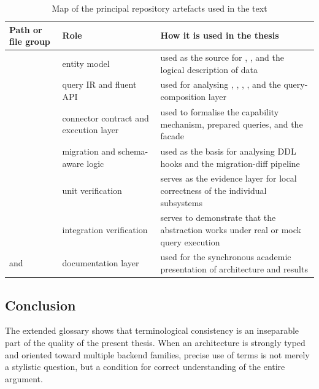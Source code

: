 \begin{table}[H]
\centering
\small
\caption{Map of the principal repository artefacts used in the text}
\label{tab:repository_artifact_map}
\begin{tabularx}{\textwidth}{L{3.8cm}L{3.1cm}Y}
\toprule
\textbf{Path or file group} & \textbf{Role} & \textbf{How it is used in the thesis} \\
\midrule
{} & entity model & used as the source for , , and the logical description of data \\
 & query IR and fluent API & used for analysing , , , , and the query-composition layer \\
 & connector contract and execution layer & used to formalise the capability mechanism, prepared queries, and the  facade \\
 & migration and schema-aware logic & used as the basis for analysing DDL hooks and the migration-diff pipeline \\
 & unit verification & serves as the evidence layer for local correctness of the individual subsystems \\
 & integration verification & serves to demonstrate that the abstraction works under real or mock query execution \\
 and  & documentation layer & used for the synchronous academic presentation of architecture and results \\
\bottomrule
\end{tabularx}
\end{table}

\subsection{Conclusion}

The extended glossary shows that terminological consistency is an inseparable part of the quality of the present thesis. When an architecture is strongly typed and oriented toward multiple backend families, precise use of terms is not merely a stylistic question, but a condition for correct understanding of the entire argument.
